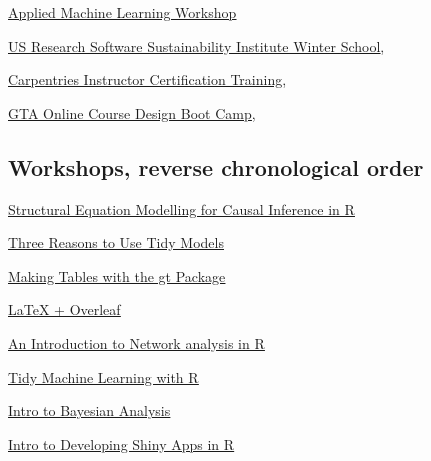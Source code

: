 \href{https://github.com/rstudio-conf-2020/applied-ml}
{\underline{Applied Machine Learning Workshop}} 

\href{https://github.com/si2-urssi/winterschool}
{\underline{US Research Software Sustainability Institute Winter School}}, 

\href{https://carpentries.github.io/instructor-training/}
{\underline{Carpentries Instructor Certification Training}}, 

\href{https://arizona.credly.com/member-badges/23099485}
{\underline{GTA Online Course Design Boot Camp}}, 


\subsection*{Workshops, reverse chronological order}

\href{https://github.com/arinbasu/2020-08-05-causality}
{\underline{Structural Equation Modelling for Causal Inference in R}}

\href{https://juliasilge.github.io/la-rug/#1}
{\underline{Three Reasons to Use Tidy Models}}

\href{https://github.com/laRusers/presentations/blob/master/2020-05-27-rich-avik/gt_talk_la_r_users-rich_i.pdf}
{\underline{Making Tables with the gt Package}}

\href{https://www.overleaf.com/read/rqbnkggvwzjh}
{\underline{LaTeX + Overleaf}}

\href{https://hackmd.io/3_I58o-_Rjm0bOj02t_YeA?both}
{\underline{An Introduction to Network analysis in R}}

\href{https://github.com/keatonwilson/resbaz_ml_workshop_R}
{\underline{Tidy Machine Learning with R}}

\href{https://github.com/Kah5/ResBaz_JAGS_tutorial}
{\underline{Intro to Bayesian Analysis}}

\href{https://github.com/aponsero/Shiny_app_workshop_2020}
{\underline{Intro to Developing Shiny Apps in R}}

